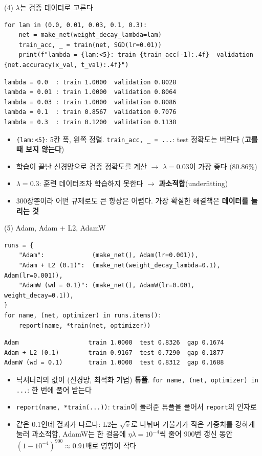 \documentclass[aspectratio=169,11pt]{beamer}
\newcommand{\code}[1]{\texttt{#1}}
\begin{document}
\begin{frame}[fragile]{(4) $\lambda$는 검증 데이터로 고른다}
\begin{lstlisting}
for lam in (0.0, 0.01, 0.03, 0.1, 0.3):
    net = make_net(weight_decay_lambda=lam)
    train_acc, _ = train(net, SGD(lr=0.01))
    print(f"lambda = {lam:<5}: train {train_acc[-1]:.4f}  validation {net.accuracy(x_val, t_val):.4f}")
\end{lstlisting}
\begin{lstlisting}[style=outstyle]
lambda = 0.0  : train 1.0000  validation 0.8028
lambda = 0.01 : train 1.0000  validation 0.8064
lambda = 0.03 : train 1.0000  validation 0.8086
lambda = 0.1  : train 0.8567  validation 0.7076
lambda = 0.3  : train 0.1200  validation 0.1138
\end{lstlisting}
\begin{itemize}
\item \code{\{lam:<5\}}: 5칸 폭, 왼쪽 정렬. \code{train\_acc, \_ = ...}: test 정확도는 버린다 (\textbf{고를 때 보지 않는다})
\item 학습이 끝난 신경망으로 검증 정확도를 계산 $\to$ $\lambda=0.03$이 가장 좋다 ($80.86\%$)
\item $\lambda=0.3$: 훈련 데이터조차 학습하지 못한다 $\to$ \textbf{과소적합}(underfitting)
\item 300장뿐이라 어떤 규제로도 큰 향상은 어렵다. 가장 확실한 해결책은 \textbf{데이터를 늘리는 것}
\end{itemize}
\end{frame}

\begin{frame}[fragile]{(5) Adam, Adam + L2, AdamW}
\begin{lstlisting}
runs = {
    "Adam":             (make_net(), Adam(lr=0.001)),
    "Adam + L2 (0.1)":  (make_net(weight_decay_lambda=0.1), Adam(lr=0.001)),
    "AdamW (wd = 0.1)": (make_net(), AdamW(lr=0.001, weight_decay=0.1)),
}
for name, (net, optimizer) in runs.items():
    report(name, *train(net, optimizer))
\end{lstlisting}
\begin{lstlisting}[style=outstyle]
Adam                   train 1.0000  test 0.8326  gap 0.1674
Adam + L2 (0.1)        train 0.9167  test 0.7290  gap 0.1877
AdamW (wd = 0.1)       train 1.0000  test 0.8312  gap 0.1688
\end{lstlisting}
\small
\begin{itemize}
\item 딕셔너리의 값이 (신경망, 최적화 기법) \textbf{튜플}. \code{for name, (net, optimizer) in ...}: 한 번에 풀어 받는다
\item \code{report(name, *train(...))}: \code{train}이 돌려준 튜플을 풀어서 \code{report}의 인자로
\item 같은 $0.1$인데 결과가 다르다: L2는 $\sqrt{\hat v}$로 나뉘며 기울기가 작은 가중치를 강하게 눌러 과소적합,
AdamW는 한 걸음에 $\eta\lambda=10^{-4}$씩 줄어 $900$번 갱신 동안 $(1-10^{-4})^{900}\approx0.91$배로 영향이 작다
\end{itemize}
\end{frame}
\end{document}
